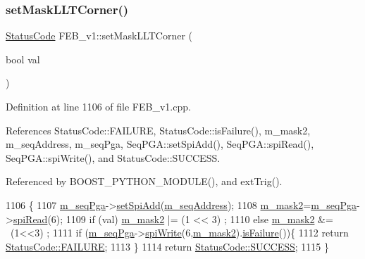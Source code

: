 \subsubsection{\texorpdfstring{set\+Mask\+L\+L\+T\+Corner()}{setMaskLLTCorner()}}
{\footnotesize\ttfamily \hyperlink{classStatusCode}{Status\+Code} F\+E\+B\+\_\+v1\+::set\+Mask\+L\+L\+T\+Corner (\begin{DoxyParamCaption}\item[{bool}]{val }\end{DoxyParamCaption})}



Definition at line 1106 of file F\+E\+B\+\_\+v1.\+cpp.



References Status\+Code\+::\+F\+A\+I\+L\+U\+RE, Status\+Code\+::is\+Failure(), m\+\_\+mask2, m\+\_\+seq\+Address, m\+\_\+seq\+Pga, Seq\+P\+G\+A\+::set\+Spi\+Add(), Seq\+P\+G\+A\+::spi\+Read(), Seq\+P\+G\+A\+::spi\+Write(), and Status\+Code\+::\+S\+U\+C\+C\+E\+SS.



Referenced by B\+O\+O\+S\+T\+\_\+\+P\+Y\+T\+H\+O\+N\+\_\+\+M\+O\+D\+U\+L\+E(), and ext\+Trig().


\begin{DoxyCode}
1106                                            \{
1107   \hyperlink{classFEB__v1_a6c7804ac86796f233a8393043adf2e77}{m\_seqPga}->\hyperlink{classSeqPGA_ac998ce3a6d9b5f2e88cc8393f8c1df53}{setSpiAdd}(\hyperlink{classFEB__v1_a1c1eb093fd1733b9510fcf8bc5c7ad08}{m\_seqAddress});
1108   \hyperlink{classFEB__v1_a25f03f6de00618dd575fc1f77a9af9ee}{m\_mask2}=\hyperlink{classFEB__v1_a6c7804ac86796f233a8393043adf2e77}{m\_seqPga}->\hyperlink{classSeqPGA_ab3d0e5e5d4014bc7a92588a76b8713d4}{spiRead}(6);
1109   \textcolor{keywordflow}{if} (val)  \hyperlink{classFEB__v1_a25f03f6de00618dd575fc1f77a9af9ee}{m\_mask2} |= (1 << 3)  ;
1110   \textcolor{keywordflow}{else}      \hyperlink{classFEB__v1_a25f03f6de00618dd575fc1f77a9af9ee}{m\_mask2} &= ~(1<<3) ;
1111   \textcolor{keywordflow}{if} (\hyperlink{classFEB__v1_a6c7804ac86796f233a8393043adf2e77}{m\_seqPga}->\hyperlink{classSeqPGA_ad4421841ce4ce8b88ad13f63216f0743}{spiWrite}(6,\hyperlink{classFEB__v1_a25f03f6de00618dd575fc1f77a9af9ee}{m\_mask2}).\hyperlink{classStatusCode_a5dd22dc6eb2c52fc4cabc58f6dea2eb7}{isFailure}())\{
1112     \textcolor{keywordflow}{return} \hyperlink{classStatusCode_a6f565cbeadc76d14c72f047e5e85eb4ba3da73d4c469762eb9d3c960368252b26}{StatusCode::FAILURE};
1113   \}
1114   \textcolor{keywordflow}{return} \hyperlink{classStatusCode_a6f565cbeadc76d14c72f047e5e85eb4badd0da38d3ba0d922efd1f4619bc37ad8}{StatusCode::SUCCESS};  
1115 \}
\end{DoxyCode}
\mbox{\label{classFEB__v1_a519a955361c420680af64c7fa9410784}} 
